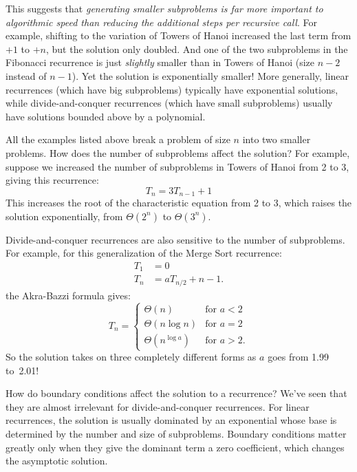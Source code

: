 This suggests that \emph{generating smaller subproblems is far more
  important to algorithmic speed than reducing the additional steps
  per recursive call}.  For example, shifting to the variation of
Towers of Hanoi increased the last term from $+1$ to $+n$, but the
solution only doubled.  And one of the two subproblems in the
Fibonacci recurrence is just \emph{slightly} smaller than in Towers of
Hanoi (size $n -2$ instead of $n-1$).  Yet the solution is
exponentially smaller!  More generally, linear recurrences (which have
big subproblems) typically have exponential solutions, while
divide-and-conquer recurrences (which have small subproblems) usually
have solutions bounded above by a polynomial.

All the examples listed above break a problem of size $n$ into two
smaller problems.  How does the number of subproblems affect the
solution?  For example, suppose we increased the number of subproblems
in Towers of Hanoi from 2 to 3, giving this recurrence:
\begin{equation*}
T_n = 3 T_{n-1} + 1
\end{equation*}
This increases the root of the characteristic equation from 2 to 3,
which raises the solution exponentially, from $\Theta(2^n)$ to
$\Theta(3^n)$.

Divide-and-conquer recurrences are also sensitive to the number of
subproblems.  For example, for this generalization of the Merge Sort
recurrence:
\begin{align*}
T_1 & = 0 \\
T_{n} & = a T_{n/2} + n - 1.
\end{align*}
the Akra-Bazzi formula gives:
\begin{equation*}
T_n = \begin{cases}
\Theta(n) & \text{for $a < 2$} \\
\Theta(n \log n) & \text{for $a = 2$} \\
\Theta(n^{\log a}) & \text{for $a > 2$}.
\end{cases}
\end{equation*}
So the solution takes on three completely different forms as $a$ goes
from 1.99 to~2.01!

How do boundary conditions affect the solution to a recurrence?  We've
seen that they are almost irrelevant for divide-and-conquer
recurrences.  For linear recurrences, the solution is usually
dominated by an exponential whose base is determined by the number and
size of subproblems.  Boundary conditions matter greatly only when
they give the dominant term a zero coefficient, which changes the
asymptotic solution.

